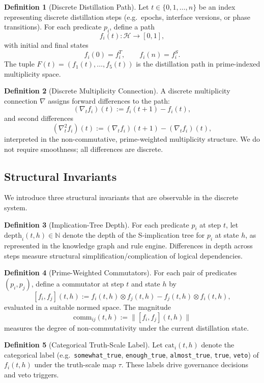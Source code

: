 \documentclass[11pt]{article}
\theoremstyle{definition}
\newtheorem{defn}{Definition}[section]
\theoremstyle{plain}
\theoremstyle{remark}
\begin{document}
\begin{defn}[Discrete Distillation Path]
Let \(t \in \{0,1,\dots,n\}\) be an index representing discrete distillation steps (e.g.\ epochs, interface versions, or phase transitions). For each predicate \(p_i\), define a path
\[
  f_i(t) : \mathcal{H} \to [0,1],
\]
with initial and final states
\[
  f_i(0) = f_i^T,
  \qquad
  f_i(n) = f_i^S.
\]
The tuple \(F(t) = (f_1(t),\dots,f_5(t))\) is the distillation path in prime-indexed multiplicity space.
\end{defn}

\begin{defn}[Discrete Multiplicity Connection]
A discrete multiplicity connection \(\nabla\) assigns forward differences to the path:
\[
  (\nabla_t f_i)(t) := f_i(t+1) - f_i(t),
\]
and second differences
\[
  (\nabla_t^2 f_i)(t) := (\nabla_t f_i)(t+1) - (\nabla_t f_i)(t),
\]
interpreted in the non-commutative, prime-weighted multiplicity structure. We do not require smoothness; all differences are discrete.
\end{defn}

\subsection{Structural Invariants}

We introduce three structural invariants that are observable in the discrete system.

\begin{defn}[Implication-Tree Depth]
For each predicate \(p_i\) at step \(t\), let \(\text{depth}_i(t,h)\in\mathbb{N}\) denote the depth of the S-implication tree for \(p_i\) at state \(h\), as represented in the knowledge graph and rule engine. Differences in depth across steps measure structural simplification/complication of logical dependencies.
\end{defn}

\begin{defn}[Prime-Weighted Commutators]
For each pair of predicates \((p_i,p_j)\), define a commutator at step \(t\) and state \(h\) by
\[
  [f_i,f_j](t,h) := f_i(t,h) \otimes f_j(t,h) - f_j(t,h) \otimes f_i(t,h),
\]
evaluated in a suitable normed space. The magnitude
\[
  \text{comm}_{ij}(t,h) := \big\| [f_i,f_j](t,h) \big\|
\]
measures the degree of non-commutativity under the current distillation state.
\end{defn}

\begin{defn}[Categorical Truth-Scale Label]
Let \(\text{cat}_i(t,h)\) denote the categorical label (e.g.\ \texttt{somewhat\_true}, \texttt{enough\_true}, \texttt{almost\_true}, \texttt{true}, \texttt{veto}) of \(f_i(t,h)\) under the truth-scale map \(\tau\). These labels drive governance decisions and veto triggers.
\end{defn}
\end{document}
